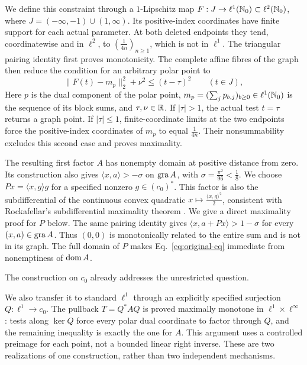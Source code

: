 We define this constraint through a $1$-Lipschitz map
$F:J\to\ell^1(\mathbb N_0)\subset\ell^2(\mathbb N_0)$, where
$J=(-\infty,-1)\cup(1,\infty)$. Its positive-index coordinates have finite
support for each actual parameter. At both deleted endpoints they tend,
coordinatewise and in $\ell^2$, to
$(\frac{1}{4n})_{n\ge1}$, which is not in $\ell^1$.
The triangular pairing identity first proves monotonicity. The complete
affine fibres of the graph then reduce the condition for an arbitrary
polar point to
\begin{equation}
\|F(t)-m_p\|_2^2+\nu^2\le(t-\tau)^2
\qquad(t\in J),
\label{eq:polar-intro}
\end{equation}
Here $p$ is the dual component of the polar point,
$m_p=(\sum_j p_{b,j})_{b\ge0}\in\ell^1(\mathbb N_0)$ is the sequence of its block
sums, and $\tau,\nu\in\mathbb R$. If $|\tau|>1$, the actual test $t=\tau$ returns a graph
point. If $|\tau|\le1$, finite-coordinate limits at the two endpoints
force the positive-index coordinates of $m_p$ to equal $\frac{1}{4n}$.
Their nonsummability excludes this second case and proves maximality.

The resulting first factor $A$ has nonempty domain at positive distance
from zero. Its construction also gives
$\langle x,a\rangle>-\sigma$ on $\operatorname{gra} A$, with
$\sigma=\frac{\pi^2}{96}<\frac{1}{8}$. We choose
$Px=\langle x,g\rangle g$ for a specified nonzero $g\in(c_0)^*$.
This factor is also the subdifferential of the continuous convex quadratic
$x\mapsto\frac{\langle x,g\rangle^2}{2}$, consistent with Rockafellar's
subdifferential maximality theorem \cite{rockafellar1970subdiff}.
We give a direct maximality proof for $P$ below.
The same pairing identity gives
$\langle x,a+Px\rangle>1-\sigma$ for every $(x,a)\in\operatorname{gra} A$.
Thus $(0,0)$ is monotonically related to the entire sum and is not in
its graph. The full domain of $P$ makes
Eq.~\eqref{eq:original-cq} immediate from nonemptiness of $\operatorname{dom} A$.

The construction on $c_0$ already addresses the unrestricted question.

We also transfer it to standard $\ell^1$ through an explicitly specified
surjection $Q:\ell^1\to c_0$. The pullback $T=Q^*AQ$ is proved maximally
monotone in $\ell^1\times\ell^\infty$: tests along $\ker Q$ force every
polar dual coordinate to factor through $Q$, and the remaining inequality
is exactly the one for $A$. This argument uses a controlled preimage for
each point, not a bounded linear right inverse.
These are two realizations of one construction, rather than two independent
mechanisms.

